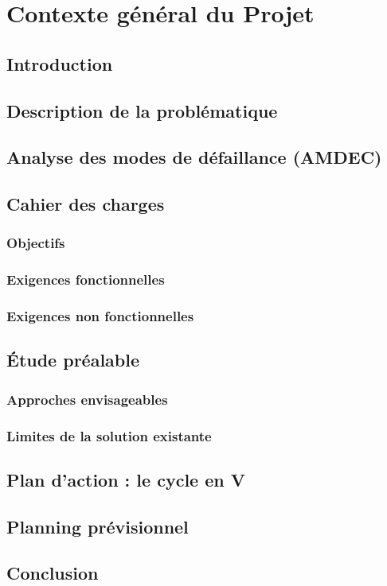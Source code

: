 \documentclass[12pt,a4paper]{report}
\begin{document}
\chapter{Contexte général du Projet}
\section*{Introduction}
\section{Description de la problématique}
\section{Analyse des modes de défaillance (AMDEC)}
\section{Cahier des charges}
\subsection{Objectifs}
\subsection{Exigences fonctionnelles}
\subsection{Exigences non fonctionnelles}
\section{Étude préalable}
\subsection{Approches envisageables}
\subsection{Limites de la solution existante}
\section{Plan d'action : le cycle en V}
\section{Planning prévisionnel}
\section*{Conclusion}
\end{document}
